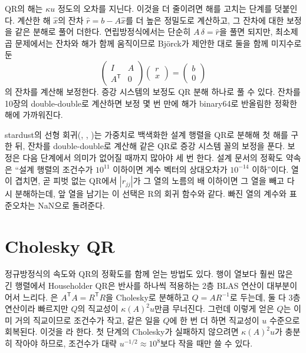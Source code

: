 QR의 해는 $\kappa u$ 정도의 오차를 지닌다. 이것을 더 줄이려면 해를 고치는 단계를 덧붙인다. 계산한 해 $\hat x$의 잔차 $\hat r=b-A\hat x$를 더 높은 정밀도로 계산하고, 그 잔차에 대한 보정을 같은 분해로 풀어 더한다. 연립방정식에서는 단순히 $A\,\delta=\hat r$을 풀면 되지만, 최소제곱 문제에서는 잔차와 해가 함께 움직이므로 Björck가 제안한 대로 둘을 함께 미지수로 둔 
\[
\begin{pmatrix}I&A\\A^{\mathsf T}&0\end{pmatrix}\begin{pmatrix}r\\x\end{pmatrix}=\begin{pmatrix}b\\0\end{pmatrix}
\]
의 잔차를 계산해 보정한다\cite{bjorck1967iterative}. 증강 시스템의 보정도 QR 분해 하나로 풀 수 있다. 잔차를 10장의 double-double로 계산하면 보정 몇 번 만에 해가 binary64로 반올림한 정확한 해에 가까워진다.

\begin{instardust}
stardust의 선형 회귀(, , )는 가중치로 백색화한 설계 행렬을 QR로 분해해 첫 해를 구한 뒤, 잔차를 double-double로 계산해 같은 QR로 증강 시스템 꼴의 보정을 푼다. 보정은 다음 단계에서 의미가 없어질 때까지 많아야 세 번 한다. 설계 문서의 정확도 약속은 ``설계 행렬의 조건수가 $10^{11}$ 이하이면 계수 벡터의 상대오차가 $10^{-14}$ 이하''이다. 열이 겹치면, 곧 피벗 없는 QR에서 $|r_{jj}|$가 그 열의 노름의 배 이하이면 그 열을 빼고 다시 분해하는데, 앞 열을 남기는 이 선택은 R의 회귀 함수와 같다. 빠진 열의 계수와 표준오차는 NaN으로 돌려준다.
\end{instardust}

\section{Cholesky QR}
\label{sec:cholesky-qr}

정규방정식의 속도와 QR의 정확도를 함께 얻는 방법도 있다. 행이 열보다 훨씬 많은 긴 행렬에서 Householder QR은 반사를 하나씩 적용하는 2층 BLAS 연산이 대부분이어서 느리다. 은 $A^{\mathsf T}A=R^{\mathsf T}R$을 Cholesky로 분해하고 $Q=AR^{-1}$로 두는데, 둘 다 3층 연산이라 빠르지만 $Q$의 직교성이 $\kappa(A)^2u$만큼 무너진다. 그런데 이렇게 얻은 $Q$는 이미 거의 직교이므로 조건수가 작고, 같은 일을 $Q$에 한 번 더 하면 직교성이 $u$ 수준으로 회복된다. 이것을 라 한다\cite{fukaya2014cholqr2}. 첫 단계의 Cholesky가 실패하지 않으려면 $\kappa(A)^2u$가 충분히 작아야 하므로, 조건수가 대략 $u^{-1/2}\approx10^8$보다 작을 때만 쓸 수 있다\cite{yamamoto2015}.

